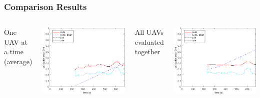 \documentclass{beamer}
\begin{document}
\begin{frame}
\frametitle{Comparison Results}
\begin{columns}[c]
\begin{center}
One UAV at a time (average)
\end{center}
\includegraphics[width=\textwidth]{100-onefull.eps}
\begin{center}
All UAVs evaluated together
\end{center}
\includegraphics[width=\textwidth]{100-multifull.eps}
\end{columns}
\end{frame}
\end{document}
